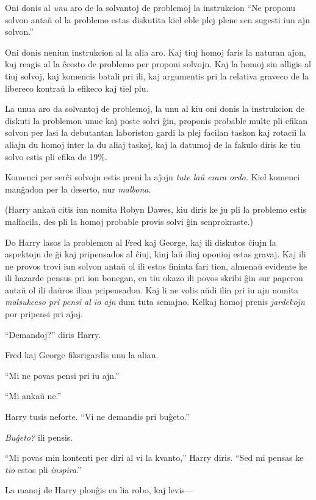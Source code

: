 Oni donis al \emph{unu} aro de la solvantoj de problemoj la
instrukcion ``Ne proponu solvon antaŭ ol la problemo estas diskutita
kiel eble plej plene sen sugesti iun ajn solvon.''

Oni donis neniun instrukcion al la alia aro. Kaj tiuj homoj faris la
naturan aĵon, kaj reagis al la ĉeesto de problemo per proponi
solvojn. Kaj la homoj sin alligis al tiuj solvoj, kaj komencis batali
pri ili, kaj argumentis pri la relativa graveco de la libereco kontraŭ
la efikeco kaj tiel plu.

La unua aro da solvantoj de problemoj, la unu al kiu oni donis la
instrukcion de diskuti la problemon unue kaj poste solvi ĝin, proponis
probable multe pli efikan solvon per lasi la debutantan laboriston
gardi la plej facilan taskon kaj rotacii la aliajn du homoj inter la
du aliaj taskoj, kaj la datumoj de la fakulo diris ke tiu solvo estis
pli efika de 19\%.

Komenci per serĉi solvojn estis preni la aĵojn \emph{tute laŭ erara
  ordo.} Kiel komenci manĝadon per la deserto, nur \emph{malbona.}

(Harry ankaŭ citis iun nomita Robyn Dawes, kiu diris ke ju pli la
problemo estis malfacila, des pli la homoj probable provis solvi ĝin
senprokraste.)

Do Harry lasos la problemon al Fred kaj George, kaj ili diskutos ĉiujn
la aspektojn de ĝi kaj pripensados al ĉiuj, kiuj laŭ iliaj oponioj estas
gravaj. Kaj ili ne provos trovi iun solvon antaŭ ol ili estos fininta
fari tion, almenaŭ evidente ke ili hazarde pensus pri ion bonegan, en
tiu okazo ili povos skribi ĝin sur paperon antaŭ ol ili daŭros ilian
pripensadon. Kaj li ne volis aŭdi ilin pri iu ajn nomita \emph{malsukceso
  pri pensi al io ajn} dum tuta semajno. Kelkaj homoj prenis
\emph{jardekojn} por pripensi pri aĵoj.

``Demandoj?'' diris Harry.

Fred kaj George fiksrigardis unu la alian.

``Mi ne povas pensi pri iu ajn.''

``Mi ankaŭ ne.''

Harry tusis neforte. ``Vi ne demandis pri buĝeto.''

\emph{Buĝeto?} ili pensis.

``Mi povas min kontenti per diri al vi la kvanto,'' Harry diris. ``Sed mi pensas ke \emph{tio} estos pli \emph{inspira}.''

La manoj de Harry plonĝis en lia robo, kaj levis—  


